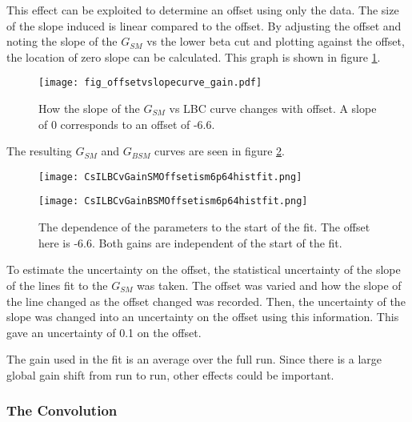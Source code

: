 \documentclass[../MaxHughesThesis.tex]{subfiles}
\begin{document}
This effect can be exploited to determine an offset using only the data. 
The size of the slope induced is linear compared to the offset. %
By adjusting the offset and noting the slope of the $G_{SM}$ vs the lower beta cut and plotting against the offset, the location of zero slope can be calculated.
This graph is shown in figure \ref{fig:slopevoffset}.
\begin{figure}[!htb]
	\centerline{\texttt{[image: fig\_offsetvslopecurve\_gain.pdf]}}
	\caption{How the slope of the $G_{SM}$ vs LBC curve changes with offset.
		 A slope of 0 corresponds to an offset of -6.6.}
	\label{fig:slopevoffset}
\end{figure}
The resulting $G_{SM}$ and $G_{BSM}$ curves are seen in figure \ref{fig:offset0LBCeffect}.

\begin{figure}
    \centering
    \begin{minipage}{0.50\textwidth}
        \centerline{\texttt{[image: CsILBCvGainSMOffsetism6p64histfit.png]}}
    \end{minipage}\hfill
    \begin{minipage}{0.50\textwidth}
        \centerline{\texttt{[image: CsILBCvGainBSMOffsetism6p64histfit.png]}}
    \end{minipage}
    \caption{The dependence of the parameters to the start of the fit.
	     The offset here is -6.6.
    	     Both gains are independent of the start of the fit.}
    \label{fig:offset0LBCeffect}
\end{figure}

To estimate the uncertainty on the offset, the statistical uncertainty of the slope of the lines fit to the $G_{SM}$  was taken.
The offset was varied and how the slope of the line changed as the offset changed was recorded.
Then, the uncertainty of the slope was changed into an uncertainty on the offset using this information.
This gave an uncertainty of 0.1 on the offset.

The gain used in the fit is an average over the full run.
Since there is a large global gain shift from run to run, other effects could be important. 

\subsubsection{The Convolution}
\end{document}
